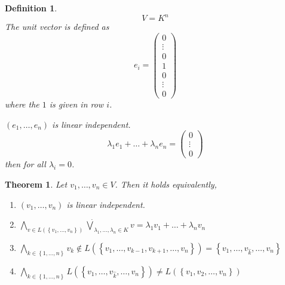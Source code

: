 \documentclass[a4paper,landscape,twocolumn]{article}
\newcommand\set[1]{\left\{#1\right\}}
\newtheorem{theorem}{Theorem}[section]
\newtheorem{defi}{Definition}[section]
\begin{document}
\begin{defi}
  \[ V = K^n \]
  The unit vector is defined as
  \[ e_i = \begin{pmatrix} 0 \\ \vdots \\ 0 \\ 1 \\ 0 \\ \vdots \\ 0 \end{pmatrix} \]
  where the $1$ is given in row $i$.

  $(e_1, \ldots, e_n)$ is linear independent.
  \[ \lambda_1 e_1 + \ldots + \lambda_n e_n = \begin{pmatrix} 0 \\ \vdots \\ 0 \end{pmatrix} \]
  then for all $\lambda_i = 0 $.
\end{defi}

\begin{theorem}
  Let $v_1, \ldots, v_n \in V$. Then it holds equivalently,
  \begin{enumerate}
    \item $(v_1, \ldots, v_n)$ is linear independent.
    \item
        $\bigwedge_{v \in L(\set{v_1, \ldots, v_n})} \dot\bigvee_{\lambda_1, \ldots, \lambda_n \in K} v
        = \lambda_1 v_1 + \ldots + \lambda_n v_n$
    \item $\bigwedge_{k \in \set{1, \ldots, n}} v_k \not\in L(\set{v_1, \ldots, v_{k-1}, v_{k+1}, \ldots, v_n})
        = \set{v_1, \ldots, v_{\hat{k}}, \ldots, v_n}$
    \item $\bigwedge_{k \in \set{1, \ldots, n}} L(\set{v_1, \ldots, v_{\hat k}, \ldots, v_n})
        \neq L(\set{v_1, v_2, \ldots, v_n})$
  \end{enumerate}
\end{theorem}
\end{document}
